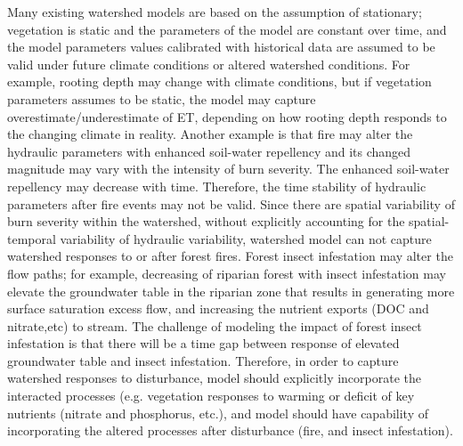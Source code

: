 \documentclass[preprint,review, 12pt]{elsarticle}
\begin{document}
Many existing watershed models are based on the assumption of stationary\citep{Wagener2010}; vegetation is static and the parameters of the model are constant over time, and the model parameters values calibrated with historical data are assumed to be valid under future climate conditions or altered watershed conditions. For example, rooting depth may change with climate conditions, but if vegetation parameters assumes to be static, the model may capture overestimate/underestimate of ET, depending on how rooting depth responds to the changing climate in reality. Another example is that fire may alter the hydraulic parameters with enhanced soil-water repellency and its changed magnitude may vary with the intensity of burn severity\citep{Ebel2014}. The enhanced soil-water repellency may decrease with time. Therefore, the time stability of hydraulic parameters after fire events may not be valid. Since there are spatial variability of burn severity within the watershed, without explicitly accounting for the spatial-temporal variability of hydraulic variability, watershed model can not capture watershed responses to or after forest fires. Forest insect infestation may alter the flow paths\citep{Ebel2014}; for example, decreasing of riparian forest with insect infestation may elevate the groundwater table in the riparian zone that results in generating more surface saturation excess flow, and increasing the nutrient exports (DOC and nitrate,etc) to stream. The challenge of modeling the impact of forest insect infestation is that there will be a time gap between response of elevated groundwater table and insect infestation. Therefore, in order to capture watershed responses to disturbance, model should explicitly incorporate the interacted processes (e.g. vegetation responses to warming or deficit of key nutrients (nitrate and phosphorus, etc.), and model should have capability of incorporating the altered processes after disturbance (fire, and insect infestation).

\end{document}
